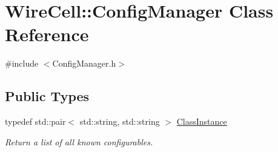 \hypertarget{class_wire_cell_1_1_config_manager}{}\section{Wire\+Cell\+:\+:Config\+Manager Class Reference}
\label{class_wire_cell_1_1_config_manager}


{\ttfamily \#include $<$Config\+Manager.\+h$>$}

\subsection*{Public Types}
\begin{DoxyCompactItemize}
\item 
typedef std\+::pair$<$ std\+::string, std\+::string $>$ \hyperlink{class_wire_cell_1_1_config_manager_adffbbcadcf6c79655c6809b9155184cb}{Class\+Instance}
\begin{DoxyCompactList}\small\item\em Return a list of all known configurables. \end{DoxyCompactList}\end{DoxyCompactItemize}
